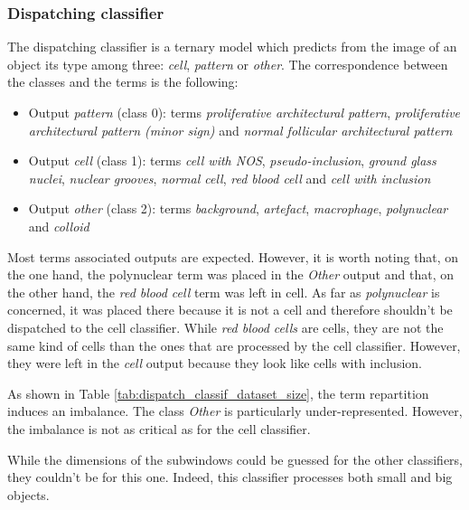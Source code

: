 \subsubsection{Dispatching classifier}
\label{sssec:thyroid_disp_model}
The dispatching classifier is a ternary model which predicts from the image of an object its type among three: \textit{cell}, \textit{pattern} or \textit{other}. The correspondence between the classes and the terms is the following:

\begin{itemize}
	\item Output \textit{pattern} (class 0): terms \textit{proliferative architectural pattern}, \textit{proliferative architectural pattern (minor sign)} and \textit{normal follicular architectural pattern}
	\item Output \textit{cell} (class 1): terms \textit{cell with NOS}, \textit{pseudo-inclusion}, \textit{ground glass nuclei}, \textit{nuclear grooves}, \textit{normal cell}, \textit{red blood cell} and \textit{cell with inclusion}
	\item Output \textit{other} (class 2): terms \textit{background}, \textit{artefact}, \textit{macrophage}, \textit{polynuclear} and \textit{colloid}
\end{itemize}

Most terms associated outputs are expected. However, it is worth noting that, on the one hand, the polynuclear term was placed in the \textit{Other} output and that, on the other hand, the \textit{red blood cell} term was left in cell. As far as \textit{polynuclear} is concerned, it was placed there because it is not a cell and therefore shouldn't be dispatched to the cell classifier. While \textit{red blood cells} are cells, they are not the same kind of cells than the ones that are processed by the cell classifier. However, they were left in the \textit{cell} output because they look like cells with inclusion.

As shown in Table \ref{tab:dispatch_classif_dataset_size}, the term repartition induces an imbalance. The class \textit{Other} is particularly under-represented. However, the imbalance is not as critical as for the cell classifier. 

While the dimensions of the subwindows could be guessed for the other classifiers, they couldn't be for this one. Indeed, this classifier processes both small and big objects. 


